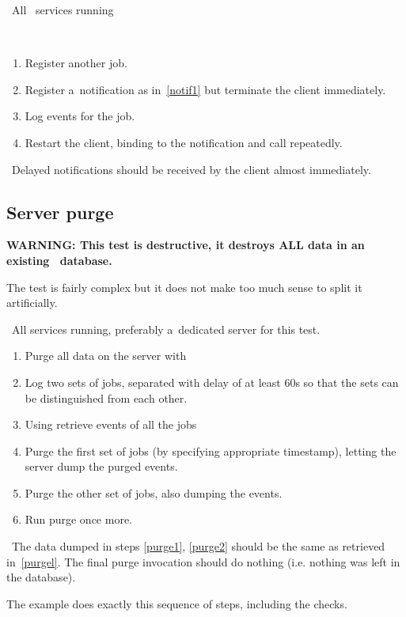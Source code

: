\req\ All \LB\ services running

\how\ 
\begin{enumerate}
\item Register another job.
\item Register a~notification as in~\ref{notif1} but terminate the client
immediately.
\item Log events for the job.
\item Restart the client, binding to the notification and call
 repeatedly.
\end{enumerate}

\result\ Delayed notifications should be received by the client almost
immediately.



\subsection{Server purge}

\textbf{WARNING: This test is destructive, it destroys ALL data in an
existing \LB\ database.} 

The test is fairly complex but it does not make too much sense to split it
artificially.

\req\ All \LB services running, preferably a~dedicated server for this test.

\how
\begin{enumerate}
\item Purge all data on the server with 
\item Log two sets of jobs, separated with delay of at least 60s so
that the sets can be distinguished from each other.
\item \label{purgel}
Using  retrieve events of all the jobs
\item \label{purge1}
Purge the first set of jobs (by specifying appropriate timestamp),
letting the server dump the purged events.
\item \label{purge2} Purge the other set of jobs, also dumping the events.
\item \label{purge3} Run purge once more.
\end{enumerate}

\result\ The data dumped in steps \ref{purge1}, \ref{purge2} should be the
same as retrieved in~\ref{purgel}. The final purge invocation should
do nothing (i.e. nothing was left in the database).

\begin{hints}
The example  does exactly this sequence of steps,
including the checks.
\end{hints}
